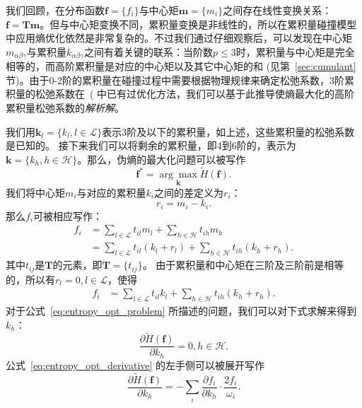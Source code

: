 我们回顾，在分布函数$\bm{f}\!=\!\{f_i\}$与中心矩$\bm{m}\!=\!\{m_i\}$之间存在线性变换关系：$\bm{f}\!=\!\bm{T}\bm{m}$。但与中心矩变换不同，累积量变换是非线性的，所以在累积量碰撞模型中应用熵优化依然是非常复杂的。不过我们通过仔细观察后，可以发现在中心矩$m_{\alpha\beta\gamma}$与累积量$k_{\alpha\beta\gamma}$之间有着关键的联系：当阶数$p\!\leq\!3$时，累积量与中心矩是完全相等的，而高阶累积量是对应的中心矩以及其它中心矩的和 (见第~\ref{sec:cumulant} 节)。由于0-2阶的累积量在碰撞过程中需要根据物理规律来确定松弛系数，3阶累积量的松弛系数在~(\citep{Geier-2017} 中已有过优化方法，我们可以基于此推导使熵最大化的高阶累积量松弛系数的\emph{解析解}。

我们用$\bm{k}_l=\{k_l, l\!\in\!\mathcal{L}\}$表示3阶及以下的累积量，如上述，这些累积量的松弛系数是已知的。
接下来我们可以将剩余的累积量，即4到6阶的，表示为$\bm{k}=\{k_h, h\!\in\!\mathcal{H}\}$。那么，伪熵的最大化问题可以被写作
\begin{equation}
    \label{eq:entropy_opt_problem}
    \bm{f}^{*} = \underset{\bm{k}}{\arg \max } \tilde{H}(\bm{f}).
\end{equation}
我们将中心矩$m_i$与对应的累积量$k_i$之间的差定义为$r_i$：
\begin{equation}
    r_i = m_i - k_i.
\end{equation}
那么$f_i$可被相应写作：
\begin{align}
    f_i &= \sum_{l \in \mathcal{L}} t_{il}m_l+\sum_{h \in \mathcal{H}} t_{ih}m_h \\
    &= \sum_{l \in \mathcal{L}} t_{il}(k_l + r_l)+\sum_{h \in \mathcal{H}} t_{ih}(k_h + r_h).
\end{align}
其中$t_{ij}$是$\bm{T}$的元素，即$\bm{T}=\{t_{ij}\}$。
由于累积量和中心矩在三阶及三阶前是相等的，所以有$r_l = 0, l \!\in\! \mathcal{L}$，使得
\begin{align}
    f_i &= \sum_{l \in \mathcal{L}} t_{il}k_l + \sum_{h \in \mathcal{H}} t_{ih}(k_h + r_h). \label{eq:fi_as_cumulants}
\end{align}
对于公式~\ref{eq:entropy_opt_problem} 所描述的问题，我们可以对下式求解来得到$k_h$：
\begin{equation}
    \label{eq:entropy_opt_derivative}
    \frac{\partial \tilde{H}(\bm{f})}{\partial k_h} = 0, h \in \mathcal{H}.
\end{equation}
公式~\ref{eq:entropy_opt_derivative} 的左手侧可以被展开写作
\begin{equation}
    \frac{\partial \tilde{H}(\bm{f})}{\partial k_h} = -\sum_i \frac{\partial f_i}{\partial k_h} \cdot \frac{2 f_i}{\omega_i}.
\end{equation}
